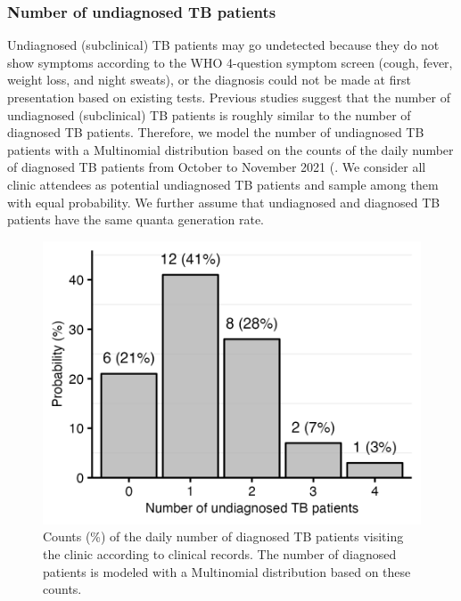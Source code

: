 \documentclass[fleqn,11pt]{wlscirep_supp}
\begin{document}
\subsubsection{Number of undiagnosed TB patients}

Undiagnosed (subclinical) TB patients may go undetected because they do not show symptoms according to the WHO 4-question symptom screen (cough, fever, weight loss, and night sweats)\cite{Berhanu2023CID}, or the diagnosis could not be made at first presentation based on existing tests\cite{Patterson2024PNAS}. Previous studies suggest that the number of undiagnosed (subclinical) TB patients is roughly similar to the number of diagnosed TB patients\cite{Berhanu2023CID,Moyo2022LancetID}. Therefore, we model the number of undiagnosed TB patients with a Multinomial distribution based on the counts of the daily number of diagnosed TB patients from October to November 2021 (. We consider all clinic attendees as potential undiagnosed TB patients and sample among them with equal probability. We further assume that undiagnosed and diagnosed TB patients have the same quanta generation rate.

\begin{figure}[!htpb]
    \centering
    \includegraphics{results/inputs/undiagnosed-tb-patients.png}
    \caption{Counts (\%) of the daily number of diagnosed TB patients visiting the clinic according to clinical records. The number of diagnosed patients is modeled with a Multinomial distribution based on these counts.}
    \label{fig:undiagnosed-distribution}
\end{figure}
\end{document}
